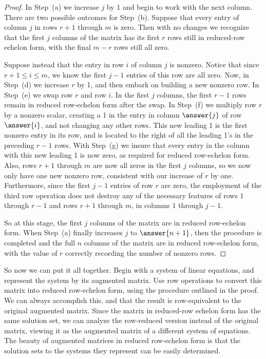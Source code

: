 \documentclass{ximera}
\begin{document}
\begin{theorem}
\begin{proof}
In Step~(a) we increase $j$ by 1 and begin to work with the next column.
There are two possible outcomes for Step~(b).  Suppose that every entry
of column $j$ in rows $r+1$ through $m$ is zero.  Then with no changes
we recognize that the first $j$ columns of the matrix has its first
$r$ rows still in reduced-row echelon form, with the final $m-r$ rows
still all zero.

Suppose instead that the entry in row $i$ of column $j$ is nonzero.
Notice that since $r+1\leq i\leq m$, we know the first $j-1$ entries
of this row are all zero.  Now, in Step~(d) we increase $r$ by 1, and
then embark on building a new nonzero row.  In Step~(e) we swap row
$r$ and row $i$.  In the first $j$ columns, the first $r-1$ rows
remain in reduced row-echelon form after the swap.  In Step~(f) we
multiply row $r$ by a nonzero scalar, creating a 1 in the entry in
column $\answer{j}$ of row $\answer{i}$, and not changing any other
rows.  This new leading 1 is the first nonzero entry in its row, and
is located to the right of all the leading 1's in the preceding $r-1$
rows.  With Step~(g) we insure that every entry in the column with
this new leading 1 is now zero, as required for reduced row-echelon
form.  Also, rows $r+1$ through $m$ are now all zeros in the first $j$
columns, so we now only have one new nonzero row, consistent with our
increase of $r$ by one.  Furthermore, since the first $j-1$ entries of
row $r$ are zero, the employment of the third row operation does not
destroy any of the necessary features of rows $1$ through $r-1$ and
rows $r+1$ through $m$, in columns $1$ through $j-1$.

So at this stage, the first $j$ columns of the matrix are in reduced
row-echelon form.  When Step~(a) finally increases $j$ to $\answer{n+1}$, then
the procedure is completed and the full $n$ columns of the matrix are
in reduced row-echelon form, with the value of $r$ correctly recording
the number of nonzero rows.
\end{proof}
\end{theorem}

So now we can put it all together.  Begin with a system of linear
equations, and represent the system by its augmented matrix.  Use row
operations to convert this matrix into reduced row-echelon form, using
the procedure outlined in the proof.  We can always accomplish this,
and that the result is row-equivalent to the original augmented
matrix.  Since the matrix in reduced-row echelon form has the same
solution set, we can analyze the row-reduced version instead of the
original matrix, viewing it as the augmented matrix of a different
system of equations.  The beauty of augmented matrices in reduced
row-echelon form is that the solution sets to the systems they
represent can be easily determined.
\end{document}
